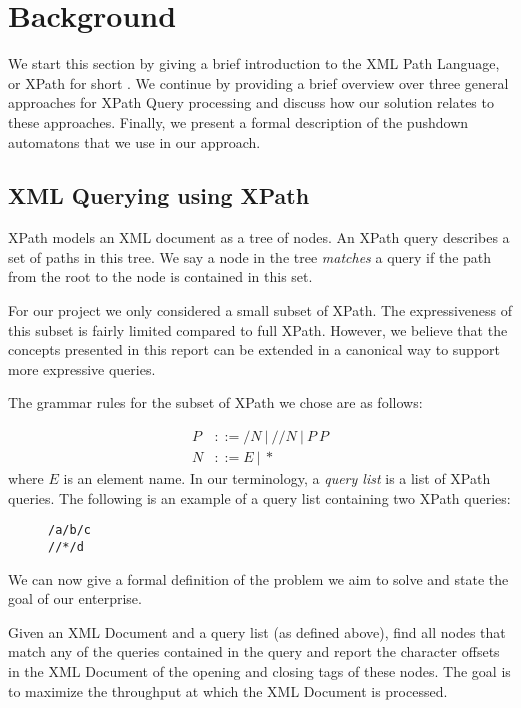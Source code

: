 \section{Background}\label{sec:background}
We start this section by giving a brief introduction to the XML Path Language,
or XPath for short \cite{xpathSpec}. We continue by providing a brief overview
over three general approaches for XPath Query processing and discuss how our
solution relates to these approaches. Finally, we present a formal description
of the pushdown automatons that we use in our approach.

\subsection{XML Querying using XPath}
XPath models an XML document as a tree of nodes. An XPath query describes a set
of paths in this tree. We say a node in the tree \emph{matches} a query if the
path from the root to the node is contained in this set.

For our project we only considered a small subset of XPath. The expressiveness
of this subset is fairly limited compared to full XPath. However, we believe
that the concepts presented in this report can be extended in a canonical way
to support more expressive queries.

The grammar rules for the subset of XPath we chose are as follows:

\begin{align*}
    P &::= /N\ |\ //N\ |\ P\ P\\
    N &::= E\ |\ *
\end{align*}
where $E$ is an element name. In our terminology, a \emph{query list} is a list
of XPath queries. The following is an example of a query list containing two
XPath queries:

\begin{figure}[htb]
\centering
\texttt{/a/b/c}\\
\texttt{//*/d}
\end{figure}

We can now give a formal definition of the problem we aim to solve and state
the goal of our enterprise. 

 Given an XML Document and a query list (as
defined above), find all nodes that match any of the queries contained in the
query and report the character offsets in the XML Document of the opening and
closing tags of these nodes. The goal is to maximize the throughput at which
the XML Document is processed.

